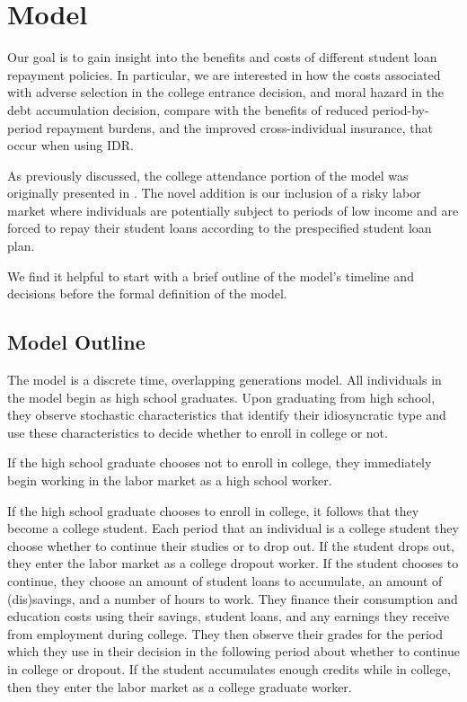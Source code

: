 
\section{Model} \label{sec:sdmodel}

Our goal is to gain insight into the benefits and costs of different student loan repayment
policies. In particular, we are interested in how the costs associated with adverse selection in the
college entrance decision, and moral hazard in the debt accumulation decision, compare with the
benefits of reduced period-by-period repayment burdens, and the improved cross-individual insurance,
that occur when using IDR.

As previously discussed, the college attendance portion of the model was originally presented in
\cite{HendricksLeukhina2017}. The novel addition is our inclusion of a risky labor market where
individuals are potentially subject to periods of low income and are forced to repay their student
loans according to the prespecified student loan plan.

We find it helpful to start with a brief outline of the model's timeline and decisions before
the formal definition of the model.


\subsection{Model Outline}

  The model is a discrete time, overlapping generations model. All individuals in the model begin as
  high school graduates. Upon graduating from high school, they observe stochastic characteristics
  that identify their idiosyncratic type and use these characteristics to decide whether to enroll
  in college or not.

  If the high school graduate chooses not to enroll in college, they immediately begin working in
  the labor market as a high school worker.

  If the high school graduate chooses to enroll in college, it follows that they become a college
  student. Each period that an individual is a college student they choose whether to continue their
  studies or to drop out. If the student drops out, they enter the labor market as a college dropout
  worker. If the student chooses to continue, they choose an amount of student loans to accumulate,
  an amount of (dis)savings, and a number of hours to work. They finance their consumption and
  education costs using their savings, student loans, and any earnings they receive from employment
  during college. They then observe their grades for the period which they use in their decision in
  the following period about whether to continue in college or dropout. If the student accumulates
  enough credits while in college, then they enter the labor market as a college graduate worker.

